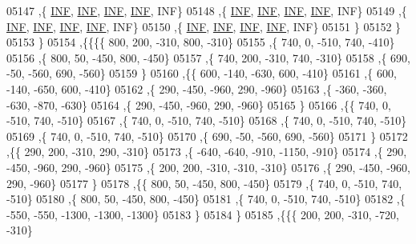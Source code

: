 \begin{DoxyCode}
05147     ,\{   \hyperlink{energy__const_8h_a12c2040f25d8e3a7b9e1c2024c618cb6}{INF},   \hyperlink{energy__const_8h_a12c2040f25d8e3a7b9e1c2024c618cb6}{INF},   \hyperlink{energy__const_8h_a12c2040f25d8e3a7b9e1c2024c618cb6}{INF},   \hyperlink{energy__const_8h_a12c2040f25d8e3a7b9e1c2024c618cb6}{INF},   INF\}
05148     ,\{   \hyperlink{energy__const_8h_a12c2040f25d8e3a7b9e1c2024c618cb6}{INF},   \hyperlink{energy__const_8h_a12c2040f25d8e3a7b9e1c2024c618cb6}{INF},   \hyperlink{energy__const_8h_a12c2040f25d8e3a7b9e1c2024c618cb6}{INF},   \hyperlink{energy__const_8h_a12c2040f25d8e3a7b9e1c2024c618cb6}{INF},   INF\}
05149     ,\{   \hyperlink{energy__const_8h_a12c2040f25d8e3a7b9e1c2024c618cb6}{INF},   \hyperlink{energy__const_8h_a12c2040f25d8e3a7b9e1c2024c618cb6}{INF},   \hyperlink{energy__const_8h_a12c2040f25d8e3a7b9e1c2024c618cb6}{INF},   \hyperlink{energy__const_8h_a12c2040f25d8e3a7b9e1c2024c618cb6}{INF},   INF\}
05150     ,\{   \hyperlink{energy__const_8h_a12c2040f25d8e3a7b9e1c2024c618cb6}{INF},   \hyperlink{energy__const_8h_a12c2040f25d8e3a7b9e1c2024c618cb6}{INF},   \hyperlink{energy__const_8h_a12c2040f25d8e3a7b9e1c2024c618cb6}{INF},   \hyperlink{energy__const_8h_a12c2040f25d8e3a7b9e1c2024c618cb6}{INF},   INF\}
05151     \}
05152    \}
05153   \}
05154  ,\{\{\{\{   800,   200,  -310,   800,  -310\}
05155     ,\{   740,     0,  -510,   740,  -410\}
05156     ,\{   800,    50,  -450,   800,  -450\}
05157     ,\{   740,   200,  -310,   740,  -310\}
05158     ,\{   690,   -50,  -560,   690,  -560\}
05159     \}
05160    ,\{\{   600,  -140,  -630,   600,  -410\}
05161     ,\{   600,  -140,  -650,   600,  -410\}
05162     ,\{   290,  -450,  -960,   290,  -960\}
05163     ,\{  -360,  -360,  -630,  -870,  -630\}
05164     ,\{   290,  -450,  -960,   290,  -960\}
05165     \}
05166    ,\{\{   740,     0,  -510,   740,  -510\}
05167     ,\{   740,     0,  -510,   740,  -510\}
05168     ,\{   740,     0,  -510,   740,  -510\}
05169     ,\{   740,     0,  -510,   740,  -510\}
05170     ,\{   690,   -50,  -560,   690,  -560\}
05171     \}
05172    ,\{\{   290,   200,  -310,   290,  -310\}
05173     ,\{  -640,  -640,  -910, -1150,  -910\}
05174     ,\{   290,  -450,  -960,   290,  -960\}
05175     ,\{   200,   200,  -310,  -310,  -310\}
05176     ,\{   290,  -450,  -960,   290,  -960\}
05177     \}
05178    ,\{\{   800,    50,  -450,   800,  -450\}
05179     ,\{   740,     0,  -510,   740,  -510\}
05180     ,\{   800,    50,  -450,   800,  -450\}
05181     ,\{   740,     0,  -510,   740,  -510\}
05182     ,\{  -550,  -550, -1300, -1300, -1300\}
05183     \}
05184    \}
05185   ,\{\{\{   200,   200,  -310,  -720,  -310\}

\end{DoxyCode}
